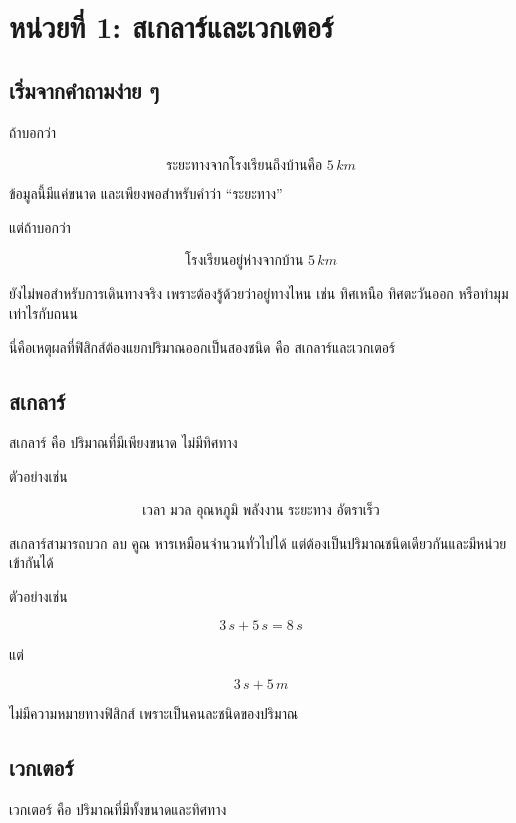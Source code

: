 \documentclass[12pt,a4paper]{report}
\begin{document}
\section{หน่วยที่ 1: สเกลาร์และเวกเตอร์}

\subsection{เริ่มจากคำถามง่าย ๆ}

ถ้าบอกว่า

\[
\text{ระยะทางจากโรงเรียนถึงบ้านคือ } 5\,\si{km}
\]

ข้อมูลนี้มีแค่ขนาด และเพียงพอสำหรับคำว่า ``ระยะทาง''

แต่ถ้าบอกว่า

\[
\text{โรงเรียนอยู่ห่างจากบ้าน } 5\,\si{km}
\]

ยังไม่พอสำหรับการเดินทางจริง เพราะต้องรู้ด้วยว่าอยู่ทางไหน เช่น ทิศเหนือ ทิศตะวันออก หรือทำมุมเท่าไรกับถนน

นี่คือเหตุผลที่ฟิสิกส์ต้องแยกปริมาณออกเป็นสองชนิด คือ สเกลาร์และเวกเตอร์

\subsection{สเกลาร์}

\begin{tcolorbox}[title=นิยาม]
สเกลาร์ คือ ปริมาณที่มีเพียงขนาด ไม่มีทิศทาง
\end{tcolorbox}

ตัวอย่างเช่น

\[
\text{เวลา มวล อุณหภูมิ พลังงาน ระยะทาง อัตราเร็ว}
\]

สเกลาร์สามารถบวก ลบ คูณ หารเหมือนจำนวนทั่วไปได้ แต่ต้องเป็นปริมาณชนิดเดียวกันและมีหน่วยเข้ากันได้

ตัวอย่างเช่น

\[
3\,\si{s}+5\,\si{s}=8\,\si{s}
\]

แต่

\[
3\,\si{s}+5\,\si{m}
\]

ไม่มีความหมายทางฟิสิกส์ เพราะเป็นคนละชนิดของปริมาณ

\subsection{เวกเตอร์}

\begin{tcolorbox}[title=นิยาม]
เวกเตอร์ คือ ปริมาณที่มีทั้งขนาดและทิศทาง
\end{tcolorbox}
\end{document}
